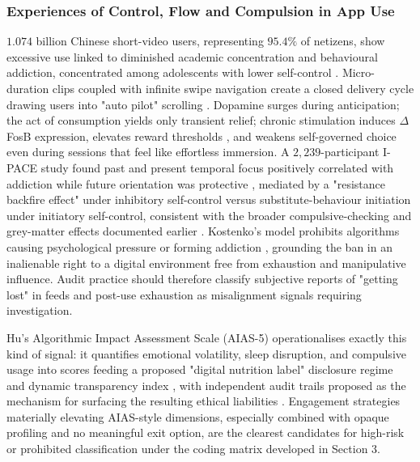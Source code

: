 \documentclass[11pt]{article}
\begin{document}
\subsubsection{Experiences of Control, Flow and Compulsion in App Use}
\label{sec:experiences_control_flow_compulsion} $1.074$ billion Chinese short-video users, representing $95.4\%$ of netizens, show excessive use linked to diminished academic concentration and behavioural addiction, concentrated among adolescents with lower self-control \parencites[2]{8958037}. Micro-duration clips coupled with infinite swipe navigation create a closed delivery cycle drawing users into "auto pilot" scrolling \parencites[2]{8958037}[3]{8958037}. Dopamine surges during anticipation; the act of consumption yields only transient relief; chronic stimulation induces $\Delta$FosB expression, elevates reward thresholds \parencites[3]{8958037}[4]{8958037}, and weakens self-governed choice even during sessions that feel like effortless immersion. A $2{,}239$-participant I-PACE study found past and present temporal focus positively correlated with addiction while future orientation was protective \parencites[4]{8958037}, mediated by a "resistance backfire effect" under inhibitory self-control versus substitute-behaviour initiation under initiatory self-control, consistent with the broader compulsive-checking and grey-matter effects documented earlier \parencites[2]{3303310}[20]{3303310}. Kostenko's model prohibits algorithms causing psychological pressure or forming addiction \parencites[61--62]{2977039}[119]{2977039}, grounding the ban in an inalienable right to a digital environment free from exhaustion and manipulative influence. Audit practice should therefore classify subjective reports of "getting lost" in feeds and post-use exhaustion as misalignment signals requiring investigation.

Hu's Algorithmic Impact Assessment Scale (AIAS-5) operationalises exactly this kind of signal: it quantifies emotional volatility, sleep disruption, and compulsive usage into scores feeding a proposed "digital nutrition label" disclosure regime and dynamic transparency index \parencites[20]{3303310}[19]{3303310}, with independent audit trails proposed as the mechanism for surfacing the resulting ethical liabilities \parencites[12]{8045684}. Engagement strategies materially elevating AIAS-style dimensions, especially combined with opaque profiling and no meaningful exit option, are the clearest candidates for high-risk or prohibited classification under the coding matrix developed in Section 3.
\end{document}
